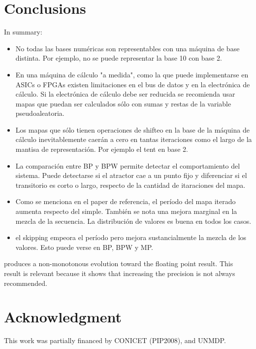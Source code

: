 \section{Conclusions}\label{sec:conclusions}
In summary:
\begin{itemize}
  \item No todas las bases numéricas son representables con una máquina de base distinta. Por ejemplo, no se puede representar la base 10 con base 2.
  \item En una máquina de cálculo "a medida", como la que puede implementarse en ASICs o FPGAs existen limitaciones en el bus de datos y en la electrónica de cálculo. Si la electrónica de cálculo debe ser reducida se recomienda usar mapas que puedan ser calculados sólo con sumas y restas de la variable pseudoaleatoria.
  \item Los mapas que sólo tienen operaciones de shifteo en la base de la máquina de cálculo inevitablemente caerán a cero en tantas iteraciones como el largo de la mantisa de representación. Por ejemplo el tent en base 2.
  \item La comparación entre BP y BPW permite detectar el comportamiento del sistema. Puede detectarse si el atractor cae a un punto fijo y diferenciar si el transitorio es corto o largo, respecto de la cantidad de itaraciones del mapa.
  \item Como se menciona en el paper de referencia, el período del mapa iterado aumenta respecto del simple. También se nota una mejora marginal en la mezcla de la secuencia. La distribución de valores es buena en todos los casos.
  \item el skipping empeora el período pero mejora sustancialmente la mezcla de los valores. Esto puede verse en BP, BPW y MP.
\end{itemize}

produces a non-monotonous evolution toward the floating point result. This result is relevant because it shows that increasing the precision is not
always recommended.

\section*{Acknowledgment}
This work was partially financed by CONICET (PIP2008),  and UNMDP.
